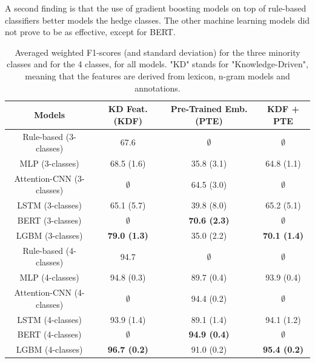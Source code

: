 \documentclass[11pt]{article}
\begin{document}
\noindent A second finding is that the use of gradient boosting models on top of rule-based classifiers better models the hedge classes. The other machine learning models did not prove to be as effective, except for BERT.

\begin{table}
  \tabcolsep=0.12cm
  \tiny
  \centering
  \begin{tabular}{c|ccc} \toprule 
    Models & KD Feat. (KDF) & Pre-Trained Emb. (PTE) & KDF + PTE \\ \midrule
    Rule-based (3-classes) &  67.6 & $\emptyset$ & $\emptyset$ \\
    MLP (3-classes) &  68.5 (1.6) & 35.8 (3.1) & 64.8 (1.1) \\
    Attention-CNN (3-classes) & $\emptyset$ &  64.5 (3.0) & $\emptyset$ \\
    LSTM (3-classes) &  65.1 (5.7) &  39.8 (8.0) &  65.2 (5.1) \\
    BERT (3-classes) & $\emptyset$ &  \textbf{70.6 (2.3)} & $\emptyset$ \\
    LGBM (3-classes) &  \textbf{79.0 (1.3)}  &  35.0 (2.2) &  \textbf{70.1 (1.4)} \\ \midrule
    Rule-based (4-classes) &  94.7 & $\emptyset$ & $\emptyset$ \\
    MLP (4-classes) &   94.8 (0.3) &  89.7 (0.4) &  93.9 (0.4) \\
    Attention-CNN (4-classes) & $\emptyset$ &  94.4 (0.2) & $\emptyset$ \\
    LSTM (4-classes) &  93.9 (1.4) &  89.1 (1.4) &  94.1 (1.2) \\
    BERT (4-classes) & $\emptyset$ &  \textbf{94.9 (0.4)} & $\emptyset$ \\
    LGBM (4-classes) &  \textbf{96.7 (0.2)}  &  91.0 (0.2) &  \textbf{95.4 (0.2)} \\ \bottomrule
  \end{tabular}
  \caption{Averaged weighted F1-scores (and standard deviation) for the three minority classes and for the 4 classes, for all models. "KD" stands for "Knowledge-Driven", meaning that the features are derived from lexicon, n-gram models and annotations.}
  \label{tab:4}
\end{table}
\end{document}
